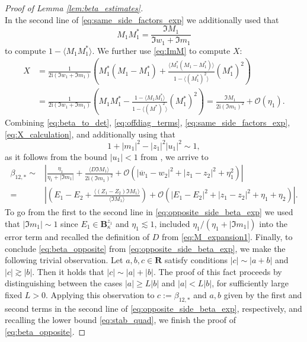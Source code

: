 \documentclass[10pt]{amsart}
\numberwithin{equation}{section}
\newcommand{\R}{\mathbf{R}}
\newcommand{\ii}{\mathrm{i}}
\begin{document}
\begin{proof}[Proof of Lemma \ref{lem:beta_estimates}]
\begin{equation}
\end{equation}
In the second line of \eqref{eq:same_side_factors_exp} we additionally used that
\begin{equation}
M_1M_1^* = \frac{\Im M_1}{\Im w_1 + \Im m_1}
\label{eq:ImM}
\end{equation}
to compute $1-\langle M_1M_1^*\rangle$. We further use \eqref{eq:ImM} to compute $X$:
\begin{equation}
\begin{split}
X&=\frac{1}{2\ii (\Im w_1+\Im m_1)} \left( M_1^*(M_1-M_1^*) + \frac{\langle M_1^*(M_1-M_1^*)\rangle}{1-\langle (M_1^*)^2\rangle}(M_1^*)^2 \right)\\
&=\frac{1}{2\ii (\Im w_1+\Im m_1)} \left( M_1M_1^* - \frac{1-\langle M_1M_1^*\rangle}{1-\langle (M^*)^2\rangle}(M_1^*)^2\right)= \frac{\Im M_1}{2\ii (\Im m_1)^2} + \mathcal{O}(\eta_1).
\end{split}
\label{eq:X_calculation}
\end{equation}
Combining \eqref{eq:beta_to_det}, \eqref{eq:offdiag_terms}, \eqref{eq:same_side_factors_exp}, \eqref{eq:X_calculation}, and additionally using that
\begin{equation*}
1+|m_1|^2 -|z_1|^2 |u_1|^2 \sim 1,
\end{equation*}
as it follows from the bound $|u_1|<1$ from \cite[Eq. (3.5)]{macroCLT_real}, we arrive to 
\begin{equation}
\begin{split}
\beta_{12,*}\sim & \left\vert \frac{\eta_1}{\eta_1+|\Im m_1|} + \frac{\langle D\Im M_1\rangle}{2\ii (\Im m_1)^2} + \mathcal{O}\left(|\overline{w}_1-w_2|^2 + |z_1-z_2|^2 + \eta_1^2\right)\right\vert\\
=& \left\vert \left(E_1-E_2 + \frac{\langle (Z_1-Z_2)\Im M_1\rangle}{\langle \Im M_1\rangle}\right) + \mathcal{O}\left(|E_1-E_2|^2 + |z_1-z_2|^2 + \eta_1+\eta_2\right)\right\vert.
\end{split}
\label{eq:opposite_side_beta_exp}
\end{equation}
To go from the first to the second line in \eqref{eq:opposite_side_beta_exp} we used that $|\Im m_1|\sim 1$ since $E_1\in \mathbf{B}^{z_1}_\kappa$ and $\eta_1\lesssim 1$, included $\eta_1/(\eta_1+|\Im m_1|)$ into the error term and recalled the definition of $D$ from \eqref{eq:M_expansion1}. Finally, to conclude \eqref{eq:beta_opposite} from \eqref{eq:opposite_side_beta_exp}, we make the following trivial observation. Let $a,b,c\in\R$ satisfy conditions $|c|\sim |a+b|$ and $|c|\gtrsim |b|$. Then it holds that $|c|\sim |a|+|b|$. The proof of this fact proceeds by distinguishing between the cases $|a|\ge L|b|$ and $|a|<L|b|$, for sufficiently large fixed $L>0$. Applying this observation to $c:=\beta_{12,*}$ and $a,b$ given by the first and second terms in the second line of \eqref{eq:opposite_side_beta_exp}, respectively, and recalling the lower bound \eqref{eq:stab_quad}, we finish the proof of \eqref{eq:beta_opposite}.


\end{proof}
\end{document}

